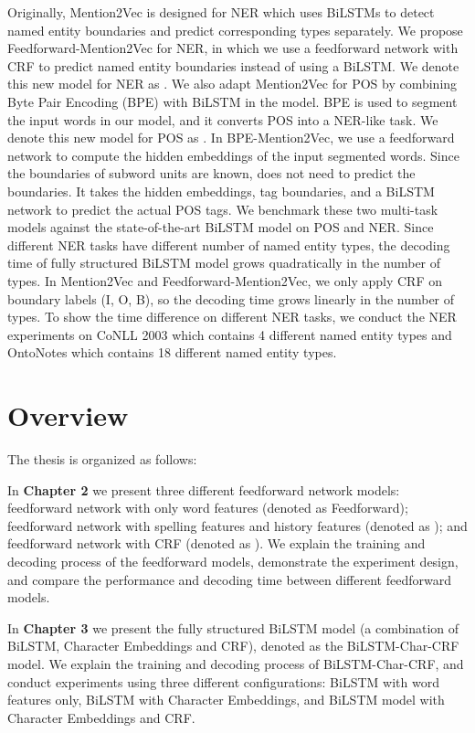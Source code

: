 \begin{enumerate}
Originally, Mention2Vec is designed for NER which uses BiLSTMs to detect named entity boundaries and predict corresponding types separately. We propose Feedforward-Mention2Vec for NER, in which we use a feedforward network with CRF to predict named entity boundaries instead of using a BiLSTM.  We denote this new model for NER as \ma. We also adapt Mention2Vec for POS by combining Byte Pair Encoding (BPE) with BiLSTM in the model. BPE is used to segment the input words in our model, and it converts POS into a NER-like task. We denote this new model for POS as \mb. In BPE-Mention2Vec, we use a feedforward network to compute the hidden embeddings of the input segmented words. Since the boundaries of subword units are known, \mb{} does not need to predict the boundaries. It takes the hidden embeddings, tag boundaries, and a BiLSTM network to predict the actual POS tags. We benchmark these two multi-task models against the state-of-the-art BiLSTM model on POS and NER. Since different NER tasks have different number of named entity types, the decoding time of fully structured BiLSTM model grows quadratically in the number of types. In Mention2Vec and Feedforward-Mention2Vec, we only apply CRF on boundary labels (I, O, B), so the decoding time grows linearly in the number of types. To show the time difference on different NER tasks, we conduct the NER experiments on CoNLL 2003 which contains 4 different named entity types and OntoNotes which contains 18 different named entity types.

\end{enumerate}


\section{Overview}
The thesis is organized as follows:

In \textbf{Chapter 2}  we present three different feedforward network models: feedforward network with only word features (denoted as Feedforward); feedforward network with spelling features and history features (denoted as \ffa); and feedforward network with CRF (denoted as \ffb). We explain the training and decoding process of the feedforward models, demonstrate the experiment design, and compare the performance and decoding time between different feedforward models.

In \textbf{Chapter 3} we present the fully structured BiLSTM model (a combination of BiLSTM, Character Embeddings and CRF), denoted as the BiLSTM-Char-CRF model. We explain the training and decoding process of BiLSTM-Char-CRF, and conduct experiments using three different configurations: BiLSTM with word features only, BiLSTM with Character Embeddings, and BiLSTM model with Character Embeddings and CRF.

